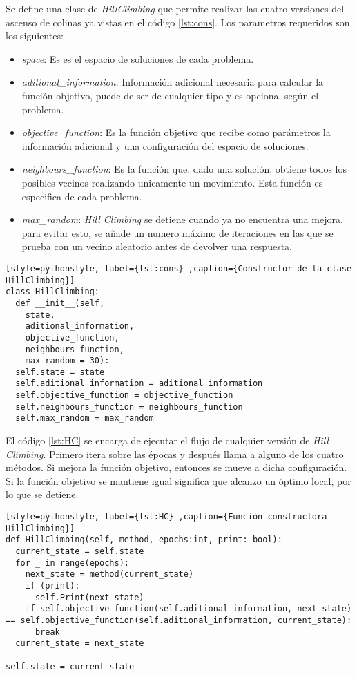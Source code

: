 \documentclass[12pt,twoside]{article}
\begin{document}
Se define una clase de \textit{HillClimbing} que permite realizar las cuatro versiones del ascenso de colinas ya vistas en el código \ref{lst:cons}. Los parametros requeridos son los siguientes:
\begin{itemize}
	\item \textit{space}: Es es el espacio de soluciones de cada problema.
	\item \textit{aditional\_information}: Información adicional necesaria para calcular la función objetivo, puede de ser de cualquier tipo y es opcional según el problema.
	\item \textit{objective\_function}: Es la función objetivo que recibe como parámetros la información adicional y una configuración del espacio de soluciones.
	\item \textit{neighbours\_function}: Es la función que, dado una solución, obtiene todos los posibles vecinos realizando unicamente un movimiento. Esta función es especifica de cada problema.
	\item \textit{max\_random}: \textit{Hill Climbing} se detiene cuando ya no encuentra una mejora, para evitar esto, se añade un numero máximo de iteraciones en las que se prueba con un vecino aleatorio antes de devolver una respuesta. 
\end{itemize}

\begin{lstlisting}[style=pythonstyle, label={lst:cons} ,caption={Constructor de la clase HillClimbing}]
class HillClimbing:
  def __init__(self, 
    state, 
    aditional_information, 
    objective_function, 
    neighbours_function, 
    max_random = 30):
  self.state = state
  self.aditional_information = aditional_information
  self.objective_function = objective_function
  self.neighbours_function = neighbours_function
  self.max_random = max_random
\end{lstlisting}

El código \ref{lst:HC} se encarga de ejecutar el flujo de cualquier versión de \textit{Hill Climbing}. Primero itera sobre las épocas y después llama a alguno de los cuatro métodos. Si mejora la función objetivo, entonces se mueve a dicha configuración. Si la función objetivo se mantiene igual significa que alcanzo un óptimo local, por lo que se detiene.

\begin{lstlisting}[style=pythonstyle, label={lst:HC} ,caption={Función constructora HillClimbing}]
def HillClimbing(self, method, epochs:int, print: bool):
  current_state = self.state
  for _ in range(epochs):
    next_state = method(current_state)
    if (print):
      self.Print(next_state)
    if self.objective_function(self.aditional_information, next_state) == self.objective_function(self.aditional_information, current_state):
      break
  current_state = next_state

self.state = current_state
\end{lstlisting}
\end{document}
